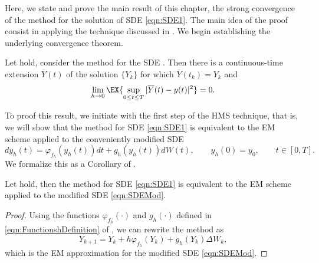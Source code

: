 	Here, we state and prove the main result of this chapter, the strong convergence of the \SM method
  for the solution of SDE \eqref{eqn:SDE1}.
The main idea of the proof consist in applying the technique discussed in .
We begin establishing the underlying convergence theorem.
\begin{thm} %
	\label{thm:StrongConvergenceLSMethod}
	Let  hold, consider the \SM method  for the 
	SDE	.
	Then there is a continuous-time extension $\overline{Y}(t)$ of the \SM solution $\{Y_k\}$ for which 
	$\overline{Y}(t_k)=Y_k$ and
	\begin{equation*}
	\lim_{h \to 0}
	\EX{
		\sup_{0\leq t \leq T}
		|\overline{Y}(t) - y(t)|^2	
	}=0.
	\end{equation*} 
\end{thm}
To proof this result, we initiate with the first step of the HMS technique, that is, we will show that the \SM method
for SDE \eqref{eqn:SDE1} is equivalent to the EM scheme applied to the conveniently modified SDE
	\begin{equation} \label{eqn:SDEMod}
		dy_h(t)= \varphi_{f_h}(y_h(t))dt +g_h(y_h(t))dW(t),
		\qquad y_h(0)=y_0,  \qquad t\in [0,T].
	\end{equation}
We formalize this as a Corollary of .

\begin{corollary}\label{col:SSSMeEMmod}
	Let  hold, then the \SM method for SDE \eqref{eqn:SDE1} is 
	equivalent to the EM scheme applied to the modified SDE \eqref{eqn:SDEMod}.
\end{corollary}
\begin{proof}
	Using the functions $\varphi_{f_h}(\cdot)$ and $g_h(\cdot)$ defined in \eqref{eqn:FunctionshDefinition} of 
	, we 
	can rewrite the \SM method  as 
	$$
		Y_{k+1} = Y_k + h \varphi_{f_h}(Y_k) + g_h(Y_k)\Delta W_k,
	$$
	which is the EM approximation for the modified SDE \eqref{eqn:SDEMod}.
\end{proof}

